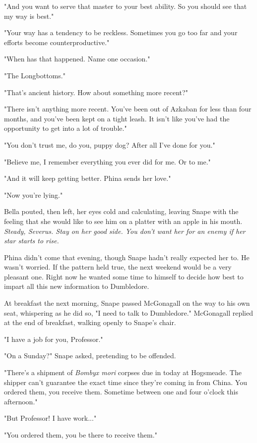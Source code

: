 "And you want to serve that master to your best ability. So you should see that my way is best."

"Your way has a tendency to be reckless. Sometimes you go too far and your efforts become counterproductive."

"When has that happened. Name one occasion."

"The Longbottoms."

"That's ancient history. How about something more recent?"

"There isn't anything more recent. You've been out of Azkaban for less than four months, and you've been kept on a tight leash. It isn't like you've had the opportunity to get into a lot of trouble."

"You don't trust me, do you, puppy dog? After all I've done for you."

"Believe me, I remember everything you ever did for me. Or to me."

"And it will keep getting better. Phina sends her love."

"Now you're lying."

Bella pouted, then left, her eyes cold and calculating, leaving Snape with the feeling that she would like to see him on a platter with an apple in his mouth. \emph{Steady, Severus. Stay on her good side. You don't want her for an enemy if her star starts to rise.}

Phina didn't come that evening, though Snape hadn't really expected her to. He wasn't worried. If the pattern held true, the next weekend would be a very pleasant one. Right now he wanted some time to himself to decide how best to impart all this new information to Dumbledore.

At breakfast the next morning, Snape passed McGonagall on the way to his own seat, whispering as he did so, "I need to talk to Dumbledore." McGonagall replied at the end of breakfast, walking openly to Snape's chair.

"I have a job for you, Professor."

"On a Sunday?" Snape asked, pretending to be offended.

"There's a shipment of \emph{Bombyx mori} corpses due in today at Hogsmeade. The shipper can't guarantee the exact time since they're coming in from China. You ordered them, you receive them. Sometime between one and four o'clock this afternoon."

"But Professor! I have work..."

"You ordered them, you be there to receive them."

